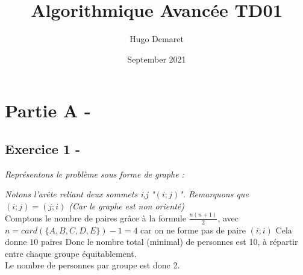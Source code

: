 \documentclass{article}
\title{Algorithmique Avancée TD01}
\author{Hugo Demaret}
\date{September 2021}
\begin{document}
\maketitle
\section*{Partie A -}
\subsection*{Exercice 1 -}
\textit{Représentons le problème sous forme de graphe :}
	\begin{center}
	\end{center}
	\textit{Notons l'arête reliant deux sommets i,j "$(i;j)$". Remarquons que $(i;j) = (j;i)$ (Car le graphe est non orienté)}\\
	\linebreak
	\textsf{Comptons le nombre de paires grâce à la formule $\frac{n(n+1)}{2} $, avec $n = card(\{A,B,C,D,E\}) -1 = 4 $ car on ne forme pas de paire $(i;i)$}
	\linebreak
	\textsf{Cela donne $ 10$ paires}
	\textsf{Donc le nombre total (minimal) de personnes est 10, à répartir entre chaque groupe équitablement.}\\
	\textsf{Le nombre de personnes par groupe est donc 2.}
\end{document}
